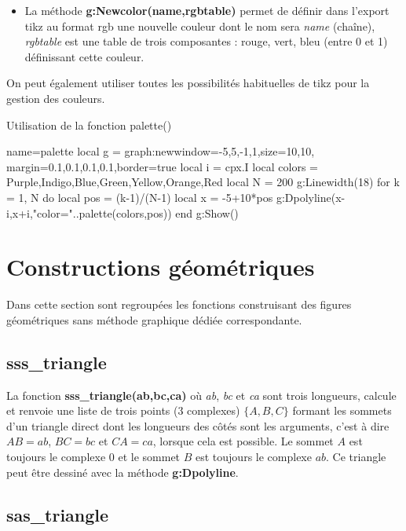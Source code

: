 \begin{itemize}
    \item La méthode \textbf{g:Newcolor(name,rgbtable)} permet de définir dans l'export tikz au format rgb une nouvelle couleur dont le nom sera \emph{name} (chaîne), \emph{rgbtable} est une table de trois composantes : rouge, vert, bleu (entre 0 et 1) définissant cette couleur.
    
\end{itemize}
On peut également utiliser toutes les possibilités habituelles de tikz pour la gestion des couleurs.

\begin{demo}{Utilisation de la fonction palette()}
\begin{luadraw}{name=palette}
local g = graph:new{window={-5,5,-1,1},size={10,10},
      margin={0.1,0.1,0.1,0.1},border=true}
local i = cpx.I
local colors = {Purple,Indigo,Blue,Green,Yellow,Orange,Red}
local N = 200
g:Linewidth(18)
for k = 1, N do
    local pos = (k-1)/(N-1)
    local x = -5+10*pos
    g:Dpolyline({x-i,x+i},"color="..palette(colors,pos))
end
g:Show()
\end{luadraw}
\end{demo}

\section{Constructions géométriques}

Dans cette section sont regroupées les fonctions construisant des figures géométriques sans méthode graphique dédiée correspondante.

\subsection{sss\_triangle}

La fonction \textbf{sss\_triangle(ab,bc,ca)} où \emph{ab}, \emph{bc} et \emph{ca} sont trois longueurs, calcule et renvoie une liste de trois points (3 complexes) $\{A,B,C\}$ formant les sommets d'un triangle direct dont les longueurs des côtés sont les arguments, c'est à dire $AB=ab$, $BC=bc$ et $CA=ca$, lorsque cela est possible. Le sommet $A$ est toujours le complexe $0$ et le sommet $B$ est toujours le complexe $ab$. Ce triangle peut être dessiné avec la méthode \textbf{g:Dpolyline}.

\subsection{sas\_triangle}

